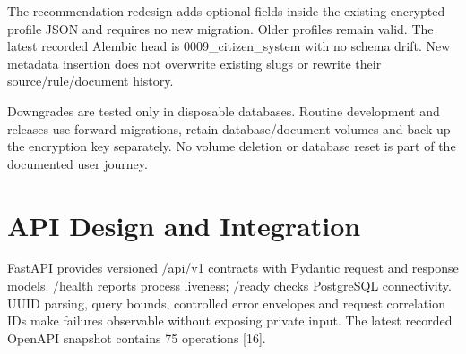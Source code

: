 \documentclass[12pt,a4paper,twoside]{report}
\begin{document}
The recommendation redesign adds optional fields inside the existing encrypted profile JSON and requires no new migration. Older profiles remain valid. The latest recorded Alembic head is 0009\_citizen\_system with no schema drift. New metadata insertion does not overwrite existing slugs or rewrite their source/rule/document history.

Downgrades are tested only in disposable databases. Routine development and releases use forward migrations, retain database/document volumes and back up the encryption key separately. No volume deletion or database reset is part of the documented user journey.

\section{API Design and Integration}

FastAPI provides versioned /api/v1 contracts with Pydantic request and response models. /health reports process liveness; /ready checks PostgreSQL connectivity. UUID parsing, query bounds, controlled error envelopes and request correlation IDs make failures observable without exposing private input. The latest recorded OpenAPI snapshot contains 75 operations [16].
\end{document}

